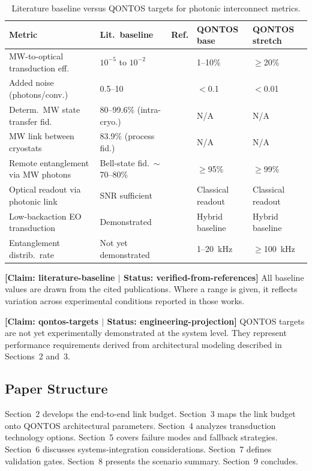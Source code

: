 \documentclass[conference]{IEEEtran}
\begin{document}
\begin{table}[H]
\centering
\caption{Literature baseline versus QONTOS targets for photonic interconnect metrics.}
\label{tab:lit-baseline}
\footnotesize
\begin{tabularx}{\columnwidth}{L{2.0cm}L{1.5cm}L{1.0cm}L{1.2cm}L{1.2cm}}
\toprule
\textbf{Metric} & \textbf{Lit.\ baseline} & \textbf{Ref.} & \textbf{QONTOS base} & \textbf{QONTOS stretch} \\
\midrule
MW-to-optical transduction eff. & $10^{-5}$ to $10^{-2}$ & \cite{Mirhosseini2020, Delaney2022} & 1--10\% & $\geq$20\% \\
Added noise (photons/conv.) & 0.5--10 & \cite{Lauk2020} & $<$0.1 & $<$0.01 \\
Determ.\ MW state transfer fid. & 80--99.6\% (intra-cryo.) & \cite{Kurpiers2018} & N/A & N/A \\
MW link between cryostats & 83.9\% (process fid.) & \cite{Magnard2020} & N/A & N/A \\
Remote entanglement via MW photons & Bell-state fid.\ $\sim$70--80\% & \cite{Zhong2019} & $\geq$95\% & $\geq$99\% \\
Optical readout via photonic link & SNR sufficient & \cite{Lecocq2021} & Classical readout & Classical readout \\
Low-backaction EO transduction & Demonstrated & \cite{Delaney2022} & Hybrid baseline & Hybrid baseline \\
Entanglement distrib.\ rate & Not yet demonstrated & \cite{Awschalom2021} & 1--20~kHz & $\geq$100~kHz \\
\bottomrule
\end{tabularx}
\end{table}

\textbf{[Claim: literature-baseline $|$ Status: verified-from-references]} All baseline values are drawn from the cited publications. Where a range is given, it reflects variation across experimental conditions reported in those works.

\textbf{[Claim: qontos-targets $|$ Status: engineering-projection]} QONTOS targets are not yet experimentally demonstrated at the system level. They represent performance requirements derived from architectural modeling described in Sections~2 and~3.

\subsection{Paper Structure}

Section~2 develops the end-to-end link budget. Section~3 maps the link budget onto QONTOS architectural parameters. Section~4 analyzes transduction technology options. Section~5 covers failure modes and fallback strategies. Section~6 discusses systems-integration considerations. Section~7 defines validation gates. Section~8 presents the scenario summary. Section~9 concludes.
\end{document}
